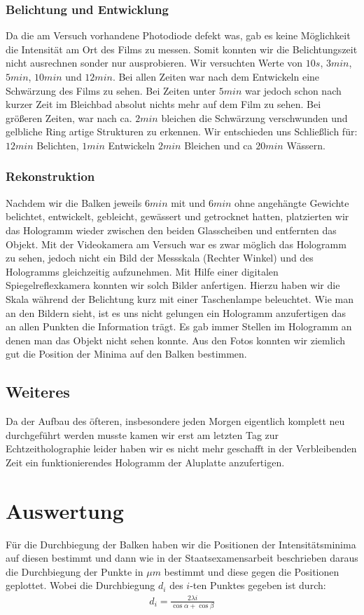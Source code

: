 \documentclass[12pt]{article}
\begin{document}
\subsubsection{Belichtung und Entwicklung}
Da die am Versuch vorhandene Photodiode defekt was, gab es keine Möglichkeit die Intensität am Ort des Films zu messen. Somit konnten wir die Belichtungszeit
nicht ausrechnen sonder nur ausprobieren. Wir versuchten Werte von $10s$, $3min$, $5min$, $10min$ und $12min$. Bei allen Zeiten war nach dem Entwickeln eine
Schwärzung des Films zu sehen. Bei Zeiten unter $5min$ war jedoch schon nach kurzer Zeit im Bleichbad absolut nichts mehr auf dem Film zu sehen. Bei größeren
Zeiten, war nach ca. $2min$ bleichen die Schwärzung verschwunden und gelbliche Ring artige Strukturen zu erkennen. Wir entschieden uns Schließlich für:
$12min$ Belichten, $1min$ Entwickeln $2min$ Bleichen und ca $20min$ Wässern.

\subsubsection{Rekonstruktion}
Nachdem wir die Balken jeweils $6min$ mit und $6min$ ohne angehängte Gewichte belichtet, entwickelt, gebleicht, gewässert und getrocknet hatten, platzierten
wir das Hologramm wieder zwischen den beiden Glasscheiben und entfernten das Objekt. Mit der Videokamera am Versuch war es zwar möglich das Hologramm zu sehen,
jedoch nicht ein Bild der Messskala (Rechter Winkel) und des Hologramms gleichzeitig aufzunehmen. Mit Hilfe einer digitalen Spiegelreflexkamera konnten wir
solch Bilder anfertigen. Hierzu haben wir die Skala während der Belichtung kurz mit einer Taschenlampe beleuchtet. Wie man an den Bildern sieht, ist es uns
nicht gelungen ein Hologramm anzufertigen das an allen Punkten die Information trägt. Es gab immer Stellen im Hologramm an denen man das Objekt nicht sehen 
konnte. Aus den Fotos konnten wir ziemlich gut die Position der Minima auf den Balken bestimmen.

\subsection{Weiteres}
Da der Aufbau des öfteren, insbesondere jeden Morgen eigentlich komplett neu durchgeführt werden musste kamen wir erst am letzten Tag zur Echtzeitholographie
leider haben wir es nicht mehr geschafft in der Verbleibenden Zeit ein funktionierendes Hologramm der Aluplatte anzufertigen.

\section{Auswertung}
Für die Durchbiegung der Balken haben wir die Positionen der Intensitätsminima auf diesen bestimmt und dann wie in der Staatsexamensarbeit beschrieben
daraus die Durchbiegung der Punkte in $\mu m$ bestimmt und diese gegen die Positionen geplottet.
Wobei die Durchbiegung $d_i$ des $i$-ten Punktes gegeben ist durch:
\begin{align}
 d_i = \frac{2 \lambda i}{\cos{\alpha} + \cos{\beta}}
\end{align}
\end{document}
